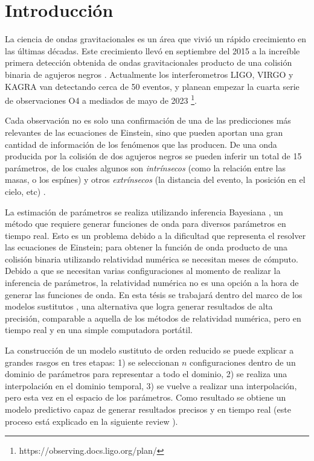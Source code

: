 \chapter{Introducción}

La ciencia de ondas gravitacionales es un área que vivió un rápido crecimiento en las últimas décadas. Este crecimiento llevó en septiembre del 2015 a la increíble primera detección obtenida de ondas gravitacionales producto de una colisión binaria de agujeros negros \cite{https://doi.org/10.48550/arxiv.1607.05251, LIGOScientific:2016aoc}. Actualmente los interferometros LIGO, VIRGO y KAGRA van detectando cerca de 50 eventos, y planean empezar la cuarta serie de observaciones O4 a mediados de mayo de 2023 \footnote{https://observing.docs.ligo.org/plan/}. 

Cada observación no es solo una confirmación de una de las predicciones más relevantes de las ecuaciones de Einstein, sino que pueden aportan una gran cantidad de información de los fenómenos que las producen. De una onda producida por la colisión de dos agujeros negros se pueden inferir un total de 15 parámetros, de los cuales algunos son \textit{intrínsecos} (como la relación entre las masas, o los espínes) y otros \textit{extrínsecos} (la distancia del evento, la posición en el cielo, etc) \cite{Veitch_2015}. 

La estimación de parámetros se realiza utilizando inferencia Bayesiana \cite{Thrane_2019}, un método que requiere generar funciones de onda para diversos parámetros en tiempo real. Esto es un problema debido a la dificultad que representa el resolver las ecuaciones de Einstein; para obtener la función de onda producto de una colisión binaria utilizando relatividad numérica se necesitan meses de cómputo. Debido a que se necesitan varias configuraciones al momento de realizar la inferencia de parámetros, la relatividad numérica no es una opción a la hora de generar las funciones de onda. En esta tésis se trabajará dentro del marco de los modelos sustitutos \cite{Field_2014}, una alternativa que logra generar resultados de alta precisión, comparable a aquella de los métodos de relatividad numérica, pero en tiempo real y en una simple computadora portátil.

La construcción de un modelo sustituto de orden reducido se puede explicar a grandes rasgos en tres etapas: 1) se seleccionan $n$ configuraciones dentro de un dominio de parámetros para representar a todo el dominio, 2) se realiza una interpolación en el dominio temporal, 3) se vuelve a realizar una interpolación, pero esta vez en el espacio de los parámetros. Como resultado se obtiene un modelo predictivo capaz de generar resultados precisos y en tiempo real (este proceso está explicado en la siguiente review \cite{Tiglio:2021ysj}).

